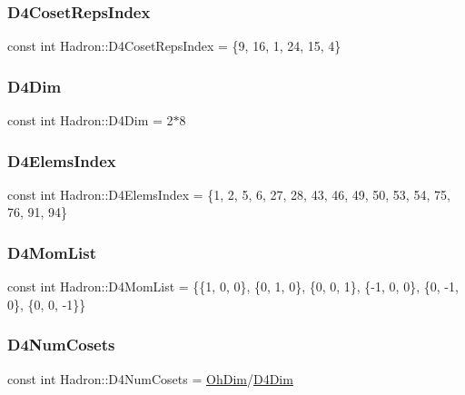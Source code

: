 \subsubsection{\texorpdfstring{D4CosetRepsIndex}{D4CosetRepsIndex}}
{\footnotesize\ttfamily const int Hadron\+::\+D4\+Coset\+Reps\+Index = \{9, 16, 1, 24, 15, 4\}}

\mbox{\label{namespaceHadron_a7cc48609a6458d05394bf6349cfbf4ca}} 
\subsubsection{\texorpdfstring{D4Dim}{D4Dim}}
{\footnotesize\ttfamily const int Hadron\+::\+D4\+Dim = 2$\ast$8}

\mbox{\label{namespaceHadron_afd73b89ce6fc83184a91cff050931ff4}} 
\subsubsection{\texorpdfstring{D4ElemsIndex}{D4ElemsIndex}}
{\footnotesize\ttfamily const int Hadron\+::\+D4\+Elems\+Index = \{1, 2, 5, 6, 27, 28, 43, 46, 49, 50, 53, 54, 75, 76, 91, 94\}}

\mbox{\label{namespaceHadron_aa5f7990f1895fa2ed975c2a6cbfbc284}} 
\subsubsection{\texorpdfstring{D4MomList}{D4MomList}}
{\footnotesize\ttfamily const int Hadron\+::\+D4\+Mom\+List = \{\{1, 0, 0\}, \{0, 1, 0\}, \{0, 0, 1\}, \{-\/1, 0, 0\}, \{0, -\/1, 0\}, \{0, 0, -\/1\}\}}

\mbox{\label{namespaceHadron_a7271d98ab4cd4b0564cf4eacf6702230}} 
\subsubsection{\texorpdfstring{D4NumCosets}{D4NumCosets}}
{\footnotesize\ttfamily const int Hadron\+::\+D4\+Num\+Cosets = \mbox{\hyperlink{namespaceHadron_a2bea98b7ecd13619ef78b6d204d59707}{Oh\+Dim}}/\mbox{\hyperlink{namespaceHadron_a7cc48609a6458d05394bf6349cfbf4ca}{D4\+Dim}}}

